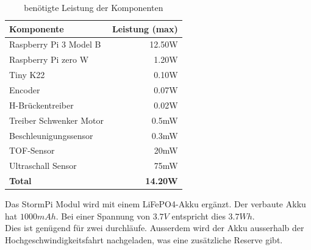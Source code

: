 \documentclass[../../main.tex]{subfiles}
\begin{document}
    \begin{table}[H] \centering
        \begin{tabular}{|l|r|}
        \hline
        \textbf{Komponente}     & \textbf{Leistung (max)} \\ \hline
        Raspberry Pi 3 Model B  & 12.50W \nocite{PiShopPi3ModelBp}                 \\ \hline
        Raspberry Pi zero W     & 1.20W \nocite{RaspiTvPiZeroPower}                   \\ \hline
        Tiny K22                & 0.10W \nocite{K22DataSheet}       \\ \hline
        Encoder                 & 0.07W                   \\ \hline
        H-Brückentreiber        & 0.02W                   \\ \hline
        Treiber Schwenker Motor & 0.5mW                   \\ \hline
        Beschleunigungssensor   & 0.3mW                   \\ \hline
        TOF-Sensor              & 20mW                    \\ \hline
        Ultraschall Sensor      & 75mW                    \\ \hline
        \textbf{Total}          & \textbf{14.20W}         \\ \hline
        \end{tabular}
        \caption{benötigte Leistung der Komponenten}
        \label{tab:et_komponente_leistung}
    \end{table}

    Das StormPi Modul wird mit einem LiFePO4-Akku ergänzt. Der verbaute Akku hat $1000mAh$. Bei einer Spannung von $3.7V$ entspricht dies $3.7Wh$. \\
    Dies ist genügend für zwei durchläufe. Ausserdem wird der Akku ausserhalb der Hochgeschwindigkeitsfahrt nachgeladen, was eine zusätzliche Reserve gibt.
\end{document}

